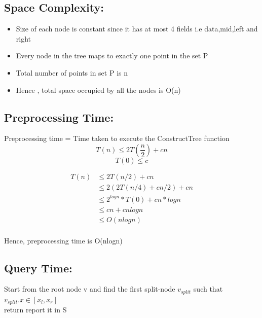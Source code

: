 \documentclass[11pt]{article}
\begin{document}
\subsection*{Space Complexity:}  
\begin{itemize}
\item Size of each node is constant since it has at most 4 fields i.e data,mid,left and right
\item Every node in the tree maps to exactly one point in the set P
\item Total number of points in set P is n
\item Hence , total space occupied by all the nodes is O(n)
\end{itemize}

\subsection*{Preprocessing Time:}

Preprocessing time = Time taken to execute the ConstructTree function
\[T(n) \leq 2T(\frac{n}{2}) + cn \]
\[T(0) \leq c\]

\begin{align*}
T(n) & \leq 2T(n/2) + cn \\
&\leq 2(2T(n/4) + cn/2) + cn \\
&\leq 2^{logn} * T(0) + cn * logn \\
&\leq cn + cnlogn   \\
&\leq O(nlogn) \\
\end{align*}


Hence, preprocessing time is O(nlogn)

\subsection*{Query Time:}

\begin{algorithm}
Start from the root node v and find the first split-node $v_{split}$ such that $v_{split}.x \in [x_l,x_r]$
 { \\
 {return \;}
 {report it in S \;}
 \;
 \;
}
\end{algorithm}
\end{document}
